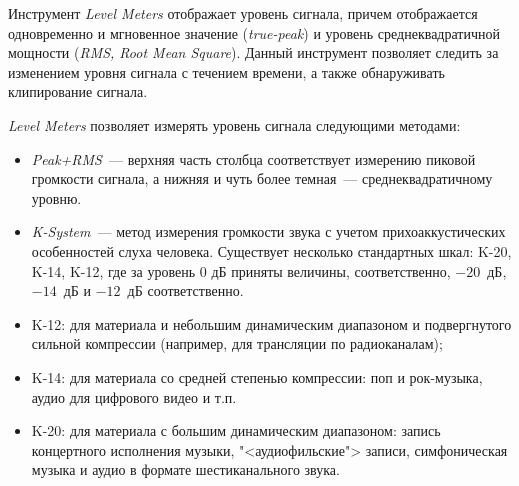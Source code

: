 \documentclass{beamer}
\begin{document}
\begin{frame}
Инструмент \textit{Level Meters} отображает уровень сигнала, причем отображается одновременно и мгновенное значение (\textit{true-peak}) и уровень среднеквадратичной мощности (\textit{RMS, Root Mean Square}). Данный инструмент позволяет следить за изменением уровня сигнала с течением времени, а также обнаруживать клипирование сигнала.

\textit{Level Meters} позволяет измерять уровень сигнала следующими методами:
\begin{itemize}
\item \textit{Peak+RMS}~--- верхняя часть столбца соответствует измерению пиковой громкости сигнала, а нижняя и чуть более темная~--- среднеквадратичному уровню.
\item \textit{K-System}~--- метод измерения громкости звука с учетом прихоаккустических особенностей слуха человека. Существует несколько стандартных шкал: K-20, K-14, K-12, где за уровень 0 дБ приняты величины, соответственно, $-20$~дБ, $-14$~дБ и $-12$~дБ соответственно.
\end{itemize}

\end{frame}

\begin{frame}
  \begin{itemize}
  	\item K-12: для материала и небольшим динамическим диапазоном и подвергнутого сильной компрессии (например, для трансляции по радиоканалам);
  	\item K-14: для материала со средней степенью компрессии: поп и рок-музыка, аудио для цифрового видео и т.п.
  	\item K-20: для материала с большим динамическим диапазоном: запись концертного исполнения музыки, "<аудиофильские"> записи, симфоническая музыка и аудио в формате шестиканального звука.
  \end{itemize}
\end{frame}
\end{document}
